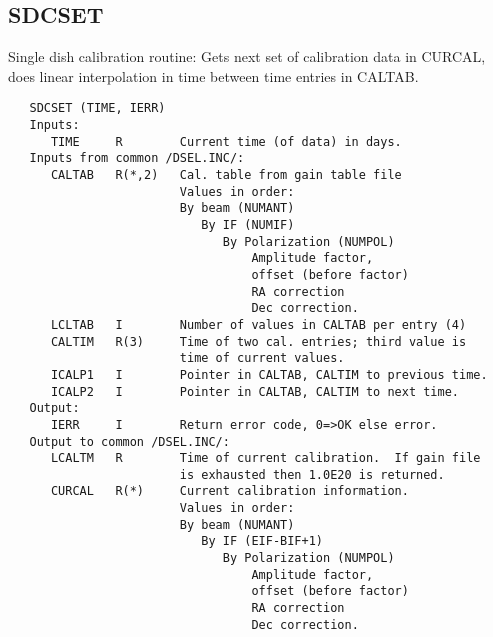 \subsection{SDCSET}
Single dish calibration routine: Gets next set of calibration data
in CURCAL, does linear interpolation in time between time entries in
CALTAB.
\begin{verbatim}
   SDCSET (TIME, IERR)
   Inputs:
      TIME     R        Current time (of data) in days.
   Inputs from common /DSEL.INC/:
      CALTAB   R(*,2)   Cal. table from gain table file
                        Values in order:
                        By beam (NUMANT)
                           By IF (NUMIF)
                              By Polarization (NUMPOL)
                                  Amplitude factor,
                                  offset (before factor)
                                  RA correction
                                  Dec correction.
      LCLTAB   I        Number of values in CALTAB per entry (4)
      CALTIM   R(3)     Time of two cal. entries; third value is
                        time of current values.
      ICALP1   I        Pointer in CALTAB, CALTIM to previous time.
      ICALP2   I        Pointer in CALTAB, CALTIM to next time.
   Output:
      IERR     I        Return error code, 0=>OK else error.
   Output to common /DSEL.INC/:
      LCALTM   R        Time of current calibration.  If gain file
                        is exhausted then 1.0E20 is returned.
      CURCAL   R(*)     Current calibration information.
                        Values in order:
                        By beam (NUMANT)
                           By IF (EIF-BIF+1)
                              By Polarization (NUMPOL)
                                  Amplitude factor,
                                  offset (before factor)
                                  RA correction
                                  Dec correction.
\end{verbatim}

